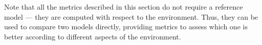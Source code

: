 \documentclass{article}
\theoremstyle{definition}
\theoremstyle{remark}
\newcommand{\realm}{{\ensuremath{M^*}}\xspace}
\newif\ifaddcomments
\newcommand{\roni}[1]{\ifaddcomments{\textcolor{red}{[Roni: #1]}}\fi}
\newcommand{\gregor}[1]{\ifaddcomments{\textcolor{orange}{[Gregor: #1]}}\fi}
\newcommand{\cm}[1]{\ifaddcomments{\textcolor{olive}{[Christian: #1]}}\fi}
\begin{document}

Note that all the metrics described in this section do not require a reference model --- they are computed with respect to the environment. Thus, they can be used to compare two models directly,  providing metrics to assess which one is better according to different aspects of the environment.





\end{document}
